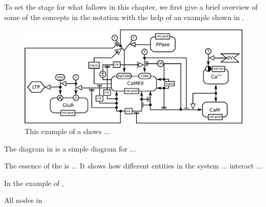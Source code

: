 
To set the stage for what follows in this chapter, we first give a brief overview of some of the concepts in the \ER notation with the help of an example shown in .



\begin{figure}[H]
  \centering
  \vspace*{-0.75em}
  \includegraphics[scale=0.8]{examples/CaMKII-intro}
   \caption{This example of a \ER shows ...}
  \label{fig:eg1}
\end{figure}

The diagram in  is a simple diagram for ...
 
The essence of the \ER is ... It shows how different entities in the system ... interact ...  

In the example of , 

All nodes in \ER

